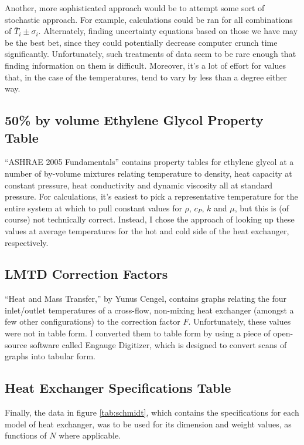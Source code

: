 \documentclass[12pt,letterpaper]{article}
\begin{document}
Another, more sophisticated approach would be to attempt some sort of stochastic approach. For example, calculations could be ran for all combinations of \(\bar{T}_i \pm \sigma_i\). Alternately, finding uncertainty equations based on those we have may be the best bet, since they could potentially decrease computer crunch time significantly. Unfortunately, such treatments of data seem to be rare enough that finding information on them is difficult. Moreover, it's a lot of effort for values that, in the case of the temperatures, tend to vary by less than a degree either way.

\subsection{50\% by volume Ethylene Glycol Property Table}

``ASHRAE 2005 Fundamentals'' contains property tables for ethylene glycol at a number of by-volume mixtures relating temperature to density, heat capacity at constant pressure, heat conductivity and dynamic viscosity all at standard pressure. For calculations, it's easiest to pick a representative temperature for the entire system at which to pull constant values for \(\rho\), \(c_P\), \(k\) and \(\mu\), but this is (of course) not technically correct. Instead, I chose the approach of looking up these values at average temperatures for the hot and cold side of the heat exchanger, respectively.

\subsection{LMTD Correction Factors}

``Heat and Mass Transfer,'' by Yunus Cengel, contains graphs relating the four inlet/outlet temperatures of a cross-flow, non-mixing heat exchanger (amongst a few other configurations) to the correction factor \(F\). Unfortunately, these values were not in table form. I converted them to table form by using a piece of open-source software called Engauge Digitizer, which is designed to convert scans of graphs into tabular form.

\subsection{Heat Exchanger Specifications Table}

Finally, the data in figure \ref{tab:schmidt}, which contains the specifications for each model of heat exchanger, was to be used for its dimension and weight values, as functions of \(N\) where applicable.
\end{document}
